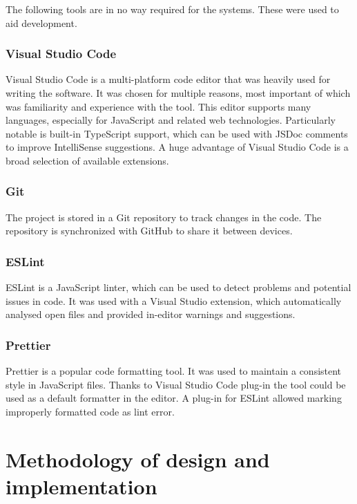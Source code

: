 The following tools are in no way required for the systems. These were used to aid development.

\subsubsection{Visual Studio Code}

Visual Studio Code is a multi-platform code editor that was heavily used for writing the software. It was chosen for multiple reasons, most important of which was familiarity and experience with the tool. This editor supports many languages, especially for JavaScript and related web technologies. Particularly notable is built-in TypeScript support, which can be used with JSDoc comments to improve IntelliSense suggestions. A huge advantage of Visual Studio Code is a broad selection of available extensions.

\subsubsection{Git}

The project is stored in a Git repository to track changes in the code. The repository is synchronized with GitHub to share it between devices.

\subsubsection{ESLint}

ESLint is a JavaScript linter, which can be used to detect problems and potential issues in code. It was used with a Visual Studio extension, which automatically analysed open files and provided in-editor warnings and suggestions.

\subsubsection{Prettier}

Prettier is a popular code formatting tool. It was used to maintain a consistent style in JavaScript files. Thanks to Visual Studio Code plug-in the tool could be used as a default formatter in the editor. A plug-in for ESLint allowed marking improperly formatted code as lint error.

\section{Methodology of design and implementation}

